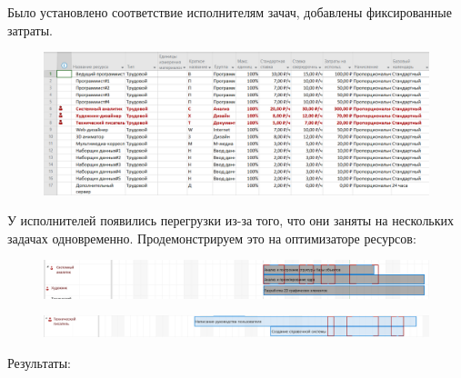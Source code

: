 Было установлено соответствие исполнителям зачач, добавлены фиксированные затраты.

\begin{figure}[H]
	\begin{center}
		\includegraphics[width=\textwidth]{imgs/task_1_1.png}
	\end{center}
\end{figure}

У исполнителей появились перегрузки из-за того, что они заняты на нескольких задачах одновременно. Продемонстрируем это на оптимизаторе ресурсов:

\begin{figure}[H]
	\begin{center}
		\includegraphics[width=\textwidth]{imgs/task_1_2.png}
	\end{center}
\end{figure}

\begin{figure}[H]
	\begin{center}
		\includegraphics[width=\textwidth]{imgs/task_1_2_1.png}
	\end{center}
\end{figure}

Результаты:

